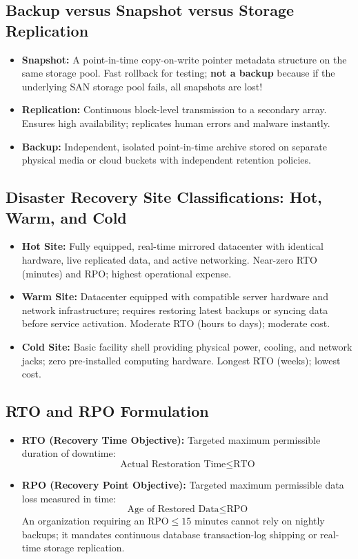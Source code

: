 \subsection{Backup versus Snapshot versus Storage Replication}
\begin{itemize}
    \item \textbf{Snapshot:} A point-in-time copy-on-write pointer metadata structure on the same storage pool. Fast rollback for testing; \textbf{not a backup} because if the underlying SAN storage pool fails, all snapshots are lost!
    \item \textbf{Replication:} Continuous block-level transmission to a secondary array. Ensures high availability; replicates human errors and malware instantly.
    \item \textbf{Backup:} Independent, isolated point-in-time archive stored on separate physical media or cloud buckets with independent retention policies.
\end{itemize}

\subsection{Disaster Recovery Site Classifications: Hot, Warm, and Cold}
\begin{itemize}
    \item \textbf{Hot Site:} Fully equipped, real-time mirrored datacenter with identical hardware, live replicated data, and active networking. Near-zero RTO (minutes) and RPO; highest operational expense.
    \item \textbf{Warm Site:} Datacenter equipped with compatible server hardware and network infrastructure; requires restoring latest backups or syncing data before service activation. Moderate RTO (hours to days); moderate cost.
    \item \textbf{Cold Site:} Basic facility shell providing physical power, cooling, and network jacks; zero pre-installed computing hardware. Longest RTO (weeks); lowest cost.
\end{itemize}

\subsection{RTO and RPO Formulation}
\begin{itemize}
    \item \textbf{RTO (Recovery Time Objective):} Targeted maximum permissible duration of downtime:
    \begin{equation}
    \text{Actual Restoration Time} \le \text{RTO}
    \end{equation}
    \item \textbf{RPO (Recovery Point Objective):} Targeted maximum permissible data loss measured in time:
    \begin{equation}
    \text{Age of Restored Data} \le \text{RPO}
    \end{equation}
    An organization requiring an $\text{RPO} \le 15\text{ minutes}$ cannot rely on nightly backups; it mandates continuous database transaction-log shipping or real-time storage replication.
\end{itemize}

